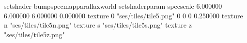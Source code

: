 setshader bumpspecmapparallaxworld
setshaderparam specscale 6.000000 6.000000 6.000000 0.000000
texture 0 "ses/tiles/tile5.png" 0 0 0 0.250000
texture n "ses/tiles/tile5n.png"
texture s "ses/tiles/tile5s.png"
texture z "ses/tiles/tile5z.png"

